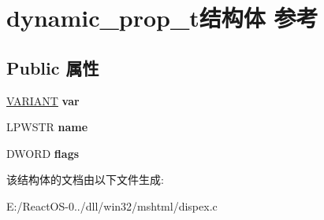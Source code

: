 \hypertarget{structdynamic__prop__t}{}\section{dynamic\+\_\+prop\+\_\+t结构体 参考}
\label{structdynamic__prop__t}
\subsection*{Public 属性}
\begin{DoxyCompactItemize}
\item 
\mbox{\label{structdynamic__prop__t_acbe86dd229a7a9d65b3f8ea8896c7a1b}} 
\hyperlink{structtag_v_a_r_i_a_n_t}{V\+A\+R\+I\+A\+NT} {\bfseries var}
\item 
\mbox{\label{structdynamic__prop__t_ab249927d5761d2bd77037f8fef1409a2}} 
L\+P\+W\+S\+TR {\bfseries name}
\item 
\mbox{\label{structdynamic__prop__t_aa4f70a8d28b3d7c4e5ff14515fac2a96}} 
D\+W\+O\+RD {\bfseries flags}
\end{DoxyCompactItemize}


该结构体的文档由以下文件生成\+:\begin{DoxyCompactItemize}
\item 
E\+:/\+React\+O\+S-\/0../dll/win32/mshtml/dispex.\+c\end{DoxyCompactItemize}
